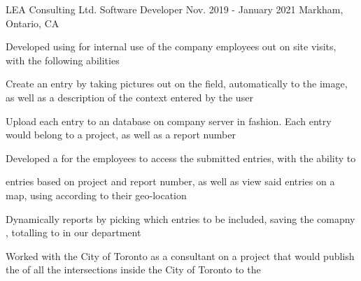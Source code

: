 

\begin{cventries}

  \cventry
  {LEA Consulting Ltd.} %
  {Software Developer} %
  {Nov. 2019 - January 2021} %
  {Markham, Ontario, CA} %
  {
    \begin{cvitems} %
      \item {Developed  using  for internal use of the company employees out on site visits, with the following abilities}
        \begin{cvsubitems}
          \item {Create an entry by taking pictures out on the field, automatically  to the image, as well as a description of the context entered by the user}
          \item {Upload each entry to an  database on company server in  fashion. Each entry would belong to a project, as well as a report number}
        \end{cvsubitems}
      \item {Developed a  for the employees to access the submitted entries, with the ability to}
        \begin{cvsubitems}
          \item { entries based on project and report number, as well as view said entries on a map, using  according to their geo-location}
          \item {Dynamically  reports by picking which entries to be included, saving the comapny , totalling to  in our department}
        \end{cvsubitems}
      \item {Worked with the City of Toronto as a consultant on a project that would publish the  of all the intersections inside the City of Toronto to the }

\end{cvitems}}
\end{cventries}
